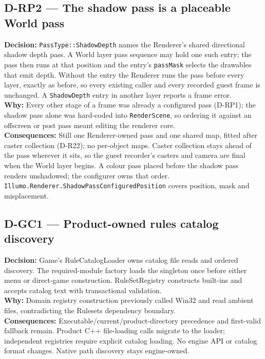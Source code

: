 \subsection*{D-RP2 --- The shadow pass is a placeable World pass}
\begin{decisionbox}[title={D-RP2 \quad 2026-10-21}]
\textbf{Decision:} \texttt{PassType::ShadowDepth} names the Renderer's shared
directional shadow depth pass. A World layer pass sequence may hold one such
entry; the pass then runs at that position and the entry's \texttt{passMask}
selects the drawables that emit depth. Without the entry the Renderer runs the
pass before every layer, exactly as before, so every existing caller and every
recorded guest frame is unchanged. A \texttt{ShadowDepth} entry in another
layer reports a frame error.\\
\textbf{Why:} Every other stage of a frame was already a configured pass
(D-RP1); the shadow pass alone was hard-coded into \texttt{RenderScene}, so
ordering it against an offscreen or post pass meant editing the renderer
core.\\
\textbf{Consequences:} Still one Renderer-owned pass and one shared map,
fitted after caster collection (D-R22); no per-object maps. Caster collection
stays ahead of the pass wherever it sits, so the guest recorder's casters and
camera are final when the World layer begins. A colour pass placed before the
shadow pass renders unshadowed; the configurer owns that order.
\texttt{Illumo.Renderer.ShadowPassConfiguredPosition} covers position, mask
and misplacement.
\end{decisionbox}

\subsection*{D-GC1 --- Product-owned rules catalog discovery}
\begin{decisionbox}[title={D-GC1 \quad 2026-09-14}]
\textbf{Decision:} Game's RuleCatalogLoader owns catalog file reads and ordered
discovery. The required-module factory loads the singleton once before either
menu or direct-game construction. RuleSetRegistry constructs built-ins and
accepts catalog text with transactional validation.\\
\textbf{Why:} Domain registry construction previously called Win32 and read
ambient files, contradicting the Rulesets dependency boundary.\\
\textbf{Consequences:} Executable/current/product-directory precedence and
first-valid fallback remain. Product C++ file-loading calls migrate to the
loader; independent registries require explicit catalog loading. No engine
API or catalog format changes. Native path discovery stays engine-owned.
\end{decisionbox}

